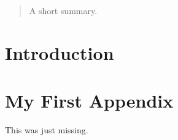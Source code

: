 \begin{frontmatter}
    \begin{abstract}
        A short summary.
    \end{abstract}

    \tableofcontents

\end{frontmatter}

\chapter{Introduction} \label{introduction}


\printbibliography[heading=bibintoc]

\appendix
\chapter{My First Appendix}
This was just missing.